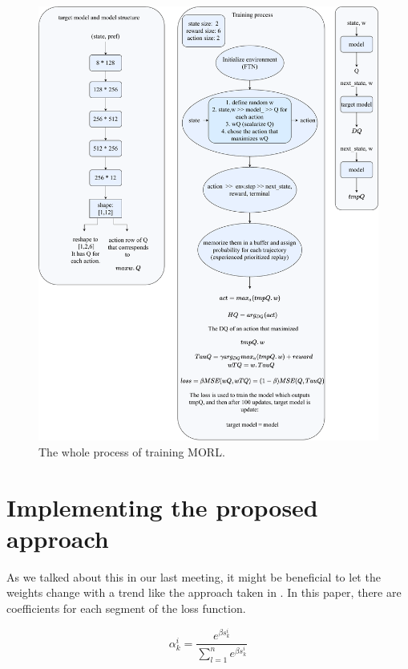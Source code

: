 \documentclass[11pt,onecolumn]{IEEEtran}
\begin{document}
\begin{figure}[!htb]
    \centering
    \includegraphics[width=1\linewidth]{process.pdf}
    \caption{The whole process of training MORL.}
    \label{fig:process}
\end{figure}

\section*{\centering\textbf{Implementing the proposed approach}}

As we talked about this in our last meeting, it might be beneficial to let the weights change with a trend like the approach taken in \cite{heydari2019softadapt}. In this paper, there are coefficients for each segment of the loss function. 

\begin{equation}
	\label{jfilt}
		\alpha_{k}^{i} = \dfrac{e^{\beta s_{k}^{i}}}{\sum_{l=1}^{n}e^{\beta s_{k}^{i}}}
\end{equation}
\end{document}
